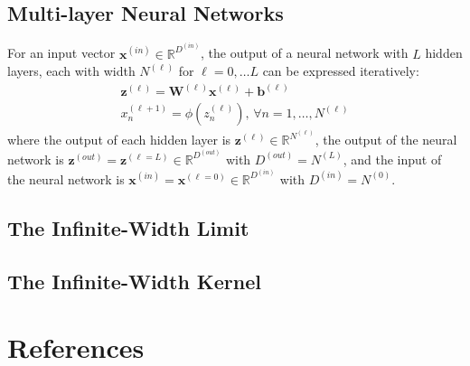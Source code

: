 \documentclass[twoside,11pt]{article}
\begin{document}
\subsection{Multi-layer Neural Networks}
For an input vector $\mathbf{x}^{(in)} \in \mathbb{R}^{D^{(in)}}$, the output of a neural network with $L$ hidden layers, each with width $N^{(\ell)}$ for $\ell = 0, \dots L$ can be expressed iteratively:
\begin{align}
    \label{multi-layer-hidden}
    \mathbf{z}^{(\ell)} = \mathbf{W}^{(\ell)} \mathbf{x}^{(\ell)} + \mathbf{b}^{(\ell)}\\
    \label{multi-layer-hidden-non-linearity}
    x_n^{(\ell+1)} = \phi(z_n^{(\ell)})\text{, } \forall n = 1, \dots, N^{(\ell)}
\end{align}
where the output of each hidden layer is $\mathbf{z}^{(\ell)} \in \mathbb{R}^{N^{(\ell)}}$, the output of the neural network is $\mathbf{z}^{(out)} = \mathbf{z}^{(\ell=L)} \in \mathbb{R}^{D^{(out)}}$ with $D^{(out)} = N^{(L)}$, and the input of the neural network is $\mathbf{x}^{(in)} = \mathbf{x}^{(\ell = 0)} \in \mathbb{R}^{D^{(in)}}$ with $D^{(in)} = N^{(0)}$.
\subsection{The Infinite-Width Limit}
\subsection{The Infinite-Width Kernel}

\begingroup
\let\clearpage\relax
\AtNextBibliography{\small}
\section*{References}
\printbibliography[heading=talikarng, title = {References}]
\endgroup
\end{document}
